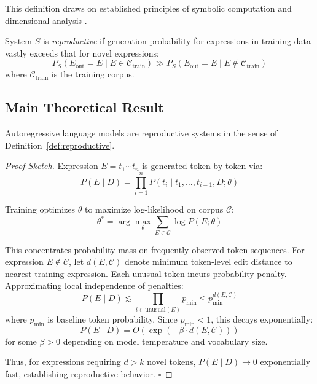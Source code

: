 \documentclass[twoside,11pt]{article}
\newcommand{\qed}{\hfill$\square$}
\begin{document}
This definition draws on established principles of symbolic computation \citep{meurer2017sympy} and dimensional analysis \citep{buckingham1914physically}.

\begin{definition}
\label{def:reproductive}
System $S$ is \emph{reproductive} if generation probability for expressions in training data vastly exceeds that for novel expressions:
\[
P_S(E_{\text{out}} = E \mid E \in \mathcal{C}_{\text{train}}) \gg P_S(E_{\text{out}} = E \mid E \notin \mathcal{C}_{\text{train}})
\]
where $\mathcal{C}_{\text{train}}$ is the training corpus.
\end{definition}

\subsection{Main Theoretical Result}

\begin{theorem}
\label{thm:llm_reproductive}
Autoregressive language models are reproductive systems in the sense of Definition~\ref{def:reproductive}\citep{lewkowycz2022minerva}.
\end{theorem}

\begin{proof}[Proof Sketch]
Expression $E = t_1 \cdots t_n$ is generated token-by-token via:
\[
P(E \mid D) = \prod_{i=1}^n P(t_i \mid t_1, \ldots, t_{i-1}, D; \theta)
\]

Training optimizes $\theta$ to maximize log-likelihood on corpus $\mathcal{C}$:
\[
\theta^* = \arg\max_\theta \sum_{E \in \mathcal{C}} \log P(E; \theta)
\]

This concentrates probability mass on frequently observed token sequences. For expression $E \notin \mathcal{C}$, let $d(E, \mathcal{C})$ denote minimum token-level edit distance to nearest training expression. Each unusual token incurs probability penalty. Approximating local independence of penalties:
\[
P(E \mid D) \lesssim \prod_{i \in \text{unusual}(E)} p_{\min} \leq p_{\min}^{d(E, \mathcal{C})}
\]
where $p_{\min}$ is baseline token probability. Since $p_{\min} < 1$, this decays exponentially:
\[
P(E \mid D) = O(\exp(-\beta \cdot d(E, \mathcal{C})))
\]
for some $\beta > 0$ depending on model temperature and vocabulary size.

Thus, for expressions requiring $d > k$ novel tokens, $P(E \mid D) \to 0$ exponentially fast, establishing reproductive behavior. \qed
\end{proof}
\end{document}

